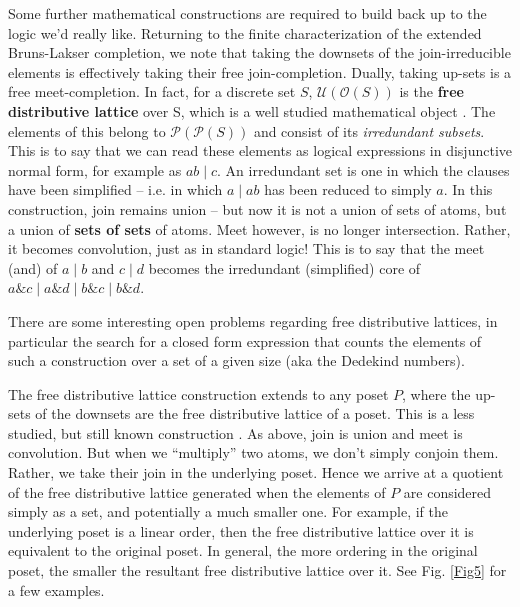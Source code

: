 \documentclass[hoptionsi,review,screen,format=acmsmall]{acmart}
\theoremstyle{definition}
\newcommand{\Oc}{\mathcal{O}}
\newcommand{\Pc}{\mathcal{P}}
\newcommand{\Ucc}{\mathcal{U}}
\newcommand{\band}{\mathop{\&}}
\newcommand{\bor}{\mathop{|}}
\begin{document}
Some further mathematical constructions are required to build back up to the logic we'd really like. Returning to the finite characterization of the extended Bruns-Lakser completion, we note that taking the downsets of the join-irreducible elements is effectively taking their free join-completion. Dually, taking up-sets is a free meet-completion. In fact, for a discrete set \(S\), \(\Ucc(\Oc(S))\) is the \textbf{free distributive lattice} over S, which is a well studied mathematical object \cite{gratzer2009lattice}. The elements of this belong to \(\Pc(\Pc(S))\) and consist of its \textit{irredundant subsets}. This is to say that we can read these elements as logical expressions in disjunctive normal form, for example as \(ab \bor c\). An irredundant set is one in which the clauses have been simplified -- i.e. in which \(a \bor ab\) has been reduced to simply \(a\).  In this construction, join remains union -- but now it is not a union of sets of atoms, but a union of \textbf{sets of sets} of atoms. Meet however, is no longer intersection. Rather, it becomes convolution, just as in standard logic! This is to say that the meet (and) of \(a \bor b\) and \(c \bor d\) becomes the irredundant (simplified) core of \(a \band c \bor a \band d \bor b \band c \bor b \band d\).

There are some interesting open problems regarding free distributive lattices, in particular the search for a closed form expression that counts the elements of such a construction over a set of a given size (aka the Dedekind numbers).

The free distributive lattice construction extends to any poset \(P\), where the up-sets of the downsets are the free distributive lattice of a poset. This is a less studied, but still known construction \cite{johnstone1982stone}. As above, join is union and meet is convolution. But when we ``multiply'' two atoms, we don't simply conjoin them. Rather, we take their join in the underlying poset. Hence we arrive at a quotient of the free distributive lattice generated when the elements of \(P\) are considered simply as a set, and potentially a much smaller one. For example, if the underlying poset is a linear order, then the free distributive lattice over it is equivalent to the original poset. In general, the more ordering in the original poset, the smaller the resultant free distributive lattice over it. See Fig. \ref{Fig5} for a few examples.
\end{document}
